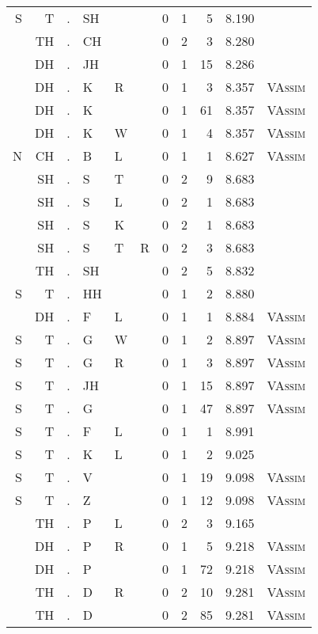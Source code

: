 \begin{longtable}{r@{ } r@{ } c@{ } l@{ } l@{ } l@{ } r r r r l }
S & T & . & SH &   &   & 0 & 1 & 5 & 8.190 &  \\
  & TH & . & CH &   &   & 0 & 2 & 3 & 8.280 &  \\
  & DH & . & JH &   &   & 0 & 1 & 15 & 8.286 &  \\
  & DH & . & K & R &   & 0 & 1 & 3 & 8.357 & \textsc{VAssim} \\
  & DH & . & K &   &   & 0 & 1 & 61 & 8.357 & \textsc{VAssim} \\
  & DH & . & K & W &   & 0 & 1 & 4 & 8.357 & \textsc{VAssim} \\
N & CH & . & B & L &   & 0 & 1 & 1 & 8.627 & \textsc{VAssim} \\
  & SH & . & S & T &   & 0 & 2 & 9 & 8.683 &  \\
  & SH & . & S & L &   & 0 & 2 & 1 & 8.683 &  \\
  & SH & . & S & K &   & 0 & 2 & 1 & 8.683 &  \\
  & SH & . & S & T & R & 0 & 2 & 3 & 8.683 &  \\
  & TH & . & SH &   &   & 0 & 2 & 5 & 8.832 &  \\
S & T & . & HH &   &   & 0 & 1 & 2 & 8.880 &  \\
  & DH & . & F & L &   & 0 & 1 & 1 & 8.884 & \textsc{VAssim} \\
S & T & . & G & W &   & 0 & 1 & 2 & 8.897 & \textsc{VAssim} \\
S & T & . & G & R &   & 0 & 1 & 3 & 8.897 & \textsc{VAssim} \\
S & T & . & JH &   &   & 0 & 1 & 15 & 8.897 & \textsc{VAssim} \\
S & T & . & G &   &   & 0 & 1 & 47 & 8.897 & \textsc{VAssim} \\
S & T & . & F & L &   & 0 & 1 & 1 & 8.991 &  \\
S & T & . & K & L &   & 0 & 1 & 2 & 9.025 &  \\
S & T & . & V &   &   & 0 & 1 & 19 & 9.098 & \textsc{VAssim} \\
S & T & . & Z &   &   & 0 & 1 & 12 & 9.098 & \textsc{VAssim} \\
  & TH & . & P & L &   & 0 & 2 & 3 & 9.165 &  \\
  & DH & . & P & R &   & 0 & 1 & 5 & 9.218 & \textsc{VAssim} \\
  & DH & . & P &   &   & 0 & 1 & 72 & 9.218 & \textsc{VAssim} \\
  & TH & . & D & R &   & 0 & 2 & 10 & 9.281 & \textsc{VAssim} \\
  & TH & . & D &   &   & 0 & 2 & 85 & 9.281 & \textsc{VAssim} \\

\end{longtable}
